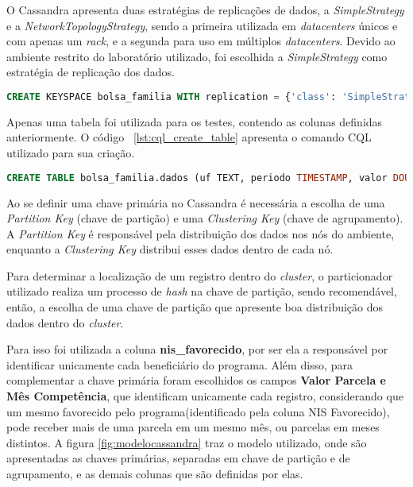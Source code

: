 O Cassandra apresenta duas estratégias de replicações de dados, a \emph{SimpleStrategy} e a \emph{NetworkTopologyStrategy}, sendo a primeira utilizada em \emph{datacenters} únicos e com apenas um \emph{rack}, e a segunda para uso em múltiplos \emph{datacenters}. Devido ao ambiente restrito do laboratório utilizado, foi escolhida a \emph{SimpleStrategy} como estratégia de replicação dos dados.

\noindent
\begin{minipage}[c]{1\textwidth}
\begin{lstlisting}[caption={Código CQL para criação do keyspace},label={lst:cql_create_keyspace},language=SQL]
CREATE KEYSPACE bolsa_familia WITH replication = {'class': 'SimpleStrategy', 'replication_factor': 1};
\end{lstlisting}
\end{minipage}

Apenas uma tabela foi utilizada para os testes, contendo as colunas definidas anteriormente. O código ~\ref{lst:cql_create_table} apresenta o comando CQL utilizado para sua criação.

\noindent
\begin{minipage}[c]{1\textwidth}
	\begin{lstlisting}[caption={Código CQL para criação da tabela},label={lst:cql_create_table},language=SQL]
	CREATE TABLE bolsa_familia.dados (uf TEXT, periodo TIMESTAMP, valor DOUBLE, nis_favorecido BIGINT, cod_municipio INT, fonte TEXT, nome_favorecido TEXT, nome_municipio TEXT, PRIMARY KEY(nis_favorecido, periodo, valor));
	\end{lstlisting}
\end{minipage}

Ao se definir uma chave primária no Cassandra é necessária a escolha de uma \emph{Partition Key} (chave de partição) e uma \emph{Clustering Key} (chave de agrupamento). A \emph{Partition Key} é responsável pela distribuição dos dados nos nós do ambiente, enquanto a \emph{Clustering Key} distribui esses dados dentro de cada nó.

Para determinar a localização de um registro dentro do \emph{cluster}, o particionador utilizado realiza um processo de \emph{hash} na chave de partição, sendo recomendável, então, a escolha de uma chave de partição que apresente boa distribuição dos dados dentro do \emph{cluster}. 

Para isso foi utilizada a coluna \textbf{nis\_favorecido}, por ser ela a responsável por identificar unicamente cada beneficiário do programa. Além disso, para complementar a chave primária foram escolhidos os campos \textbf{Valor Parcela e Mês Competência}, que identificam unicamente cada registro, considerando que um mesmo favorecido pelo programa(identificado pela coluna NIS Favorecido), pode receber mais de uma parcela em um mesmo mês, ou parcelas em meses distintos. A figura \ref{fig:modelocassandra} traz o modelo utilizado, onde são apresentadas as chaves primárias, separadas em chave de partição e de agrupamento, e as demais colunas que são definidas por elas.

